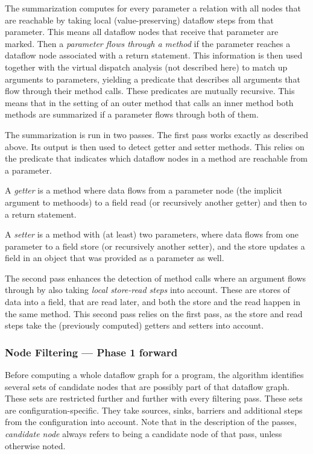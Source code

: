 The summarization computes for every parameter a relation with all nodes 
that are reachable by taking local (value-preserving) dataflow steps from that parameter.
This means all dataflow nodes that receive that parameter are marked.
Then a \emph{parameter flows through a method} if the parameter reaches a 
dataflow node associated with a return statement.
This information is then used together with the virtual dispatch analysis
(not described here) to match up arguments to parameters, yielding a predicate 
that describes all arguments that flow through their method calls.
These predicates are mutually recursive.
This means that in the setting of an outer method that calls an inner 
method both methods are summarized if a parameter flows through both of them.

The summarization is run in two passes.
The first pass works exactly as described above.
Its output is then used to detect getter and setter methods.
This relies on the predicate that indicates which dataflow nodes in a method are
reachable from a parameter.

A \emph{getter} is a method where data flows from a parameter node 
(the implicit  argument to methoods) to a field read (or recursively another getter)
and then to a return statement.

A \emph{setter} is a method with (at least) two parameters,
where data flows from one parameter to a field store (or recursively another setter),
and the store updates a field in an object that was provided as a parameter as well.

The second pass enhances the detection of method calls where an argument flows through 
by also taking \emph{local store-read steps} into account.
These are stores of data into a field, that are read later, and both 
the store and the read happen in the same method.
This second pass relies on the first pass, as the store and read steps take the 
(previously computed) getters and setters into account.

\subsubsection*{Node Filtering --- Phase 1 forward}
Before computing a whole dataflow graph for a program,
the algorithm identifies several sets of candidate nodes that are possibly part of 
that dataflow graph.
These sets are restricted further and further with every filtering pass.
These sets are configuration-specific.
They take sources, sinks, barriers and additional steps from the configuration into 
account.
Note that in the description of the passes, \emph{candidate node} always refers
to being a candidate node of that pass, unless otherwise noted.

